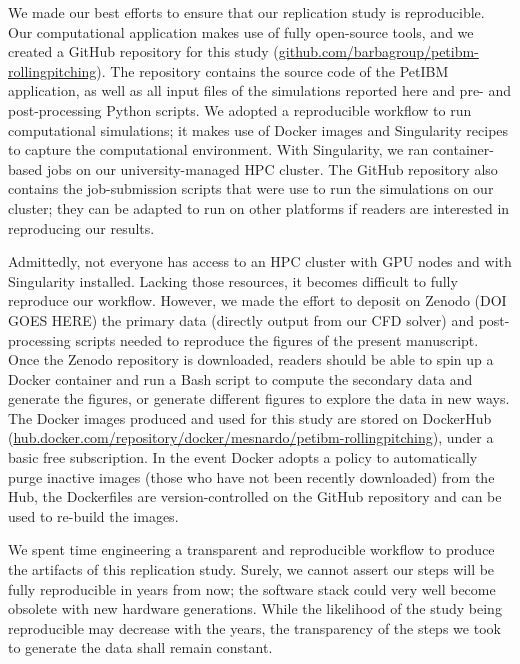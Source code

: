 We made our best efforts to ensure that our replication study is reproducible.
Our computational application makes use of fully open-source tools, and
we created a GitHub repository for this study (\url{github.com/barbagroup/petibm-rollingpitching}).
The repository contains the source code of the PetIBM application, as well as all input files of the simulations reported here and pre- and post-processing Python scripts.
We adopted a reproducible workflow to run computational simulations; it makes use of Docker images and Singularity recipes to capture the computational environment.
With Singularity, we ran container-based jobs on our university-managed HPC cluster.
The GitHub repository also contains the job-submission scripts that were use to run the simulations on our cluster; they can be adapted to run on other platforms if readers are interested in reproducing our results.

Admittedly, not everyone has access to an HPC cluster with GPU nodes and with Singularity installed.
Lacking those resources, it becomes difficult to fully reproduce our workflow.
However, we made the effort to deposit on Zenodo (DOI GOES HERE) the primary data (directly output from our CFD solver) and post-processing scripts needed to reproduce the figures of the present manuscript.
Once the Zenodo repository is downloaded, readers should be able to spin up a Docker container and run a Bash script to compute the secondary data and generate the figures,
or generate different figures to explore the data in new ways.
The Docker images produced and used for this study are stored on DockerHub (\url{hub.docker.com/repository/docker/mesnardo/petibm-rollingpitching}), under a basic free subscription.
In the event Docker adopts a policy to automatically purge inactive images (those who have not been recently downloaded) from the Hub, the Dockerfiles are version-controlled on the GitHub repository and can be used to re-build the images.

We spent time engineering a transparent and reproducible workflow to produce the artifacts of this replication study.
Surely, we cannot assert our steps will be fully reproducible in years from now; the software stack could very well become obsolete with new hardware generations.
While the likelihood of the study being reproducible may decrease with the years, the transparency of the steps we took to generate the data shall remain constant.
